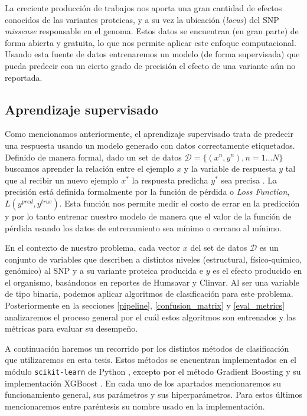 La creciente producción de trabajos nos aporta una gran cantidad de efectos conocidos de las variantes proteicas, y a su vez la ubicación (\textit{locus}) del SNP \textit{missense} responsable en el genoma. Estos datos se encuentran (en gran parte) de forma abierta y gratuita, lo que nos permite aplicar este enfoque computacional. Usando esta fuente de datos entrenaremos un modelo (de forma supervisada) que pueda predecir con un cierto grado de precisión el efecto de una variante aún no reportada. 


\subsection{Aprendizaje supervisado}

Como mencionamos anteriormente, el aprendizaje supervisado trata de predecir una respuesta usando un modelo generado con datos correctamente etiquetados. Definido de manera formal, dado un set de datos $ \mathcal{D} = \{(x^n, y^n), n = 1...N\}$  buscamos aprender la relación entre el ejemplo $x$ y la variable de respuesta $y$ tal que al recibir un nuevo ejemplo $x^*$ la respuesta predicha $y^*$ sea precisa \cite{Barber2011}. La precisión está definida formalmente por la función de pérdida o \textit{Loss Function}, $L(y^{pred}, y^{true})$. Esta función nos permite medir el costo de errar en la predicción y por lo tanto entrenar nuestro modelo de manera que el valor de la función de pérdida usando los datos de entrenamiento sea mínimo o cercano al mínimo.

En el contexto de nuestro problema, cada vector $x$ del set de datos $\mathcal{D}$ es un conjunto de variables que describen a distintos niveles (estructural, físico-químico, genómico) al SNP y a su variante proteica producida e $y$ es el efecto producido en el organismo, basándonos en reportes de Humsavar y Clinvar. Al ser una variable de tipo binaria, podemos aplicar algoritmos de clasificación para este problema. Posteriormente en la secciones \ref{pipeline}, \ref{confusion_matrix} y \ref{eval_metrics} analizaremos el proceso general por el cuál estos algoritmos son entrenados y las métricas para evaluar su desempeño.

A continuación haremos un recorrido por los distintos métodos de clasificación que utilizaremos en esta tesis. Estos métodos se encuentran implementados en el módulo \texttt{scikit-learn} de Python \cite{scikit-learn}, excepto por el método Gradient Boosting y su implementación XGBoost \cite{xgboost}. En cada uno de los apartados mencionaremos su funcionamiento general, sus parámetros y sus hiperparámetros. Para estos últimos mencionaremos entre paréntesis su nombre usado en la implementación.

